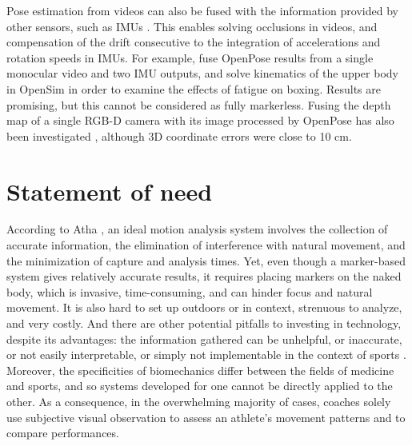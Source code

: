 Pose estimation from videos can also be fused with the information provided by other sensors, such as IMUs \cite{Bao2022, Zhang2020}. This enables solving occlusions in videos, and compensation of the drift consecutive to the integration of accelerations and rotation speeds in IMUs. For example, \cite{Haralabidis2020} fuse OpenPose results from a single monocular video and two IMU outputs, and solve kinematics of the upper body in OpenSim in order to examine the effects of fatigue on boxing. Results are promising, but this cannot be considered as fully markerless. Fusing the depth map of a single RGB-D camera with its image processed by OpenPose has also been investigated \cite{Liu2022c}, although 3D coordinate errors were close to 10 cm.

\medskip


\section{Statement of need}\label{sec:statement of need}

According to Atha \cite{Atha1984}, an ideal motion analysis system involves the collection of accurate information, the elimination of interference with natural movement, and the minimization of capture and analysis times. Yet, even though a marker-based system gives relatively accurate results, it requires placing markers on the naked body, which is invasive, time-consuming, and can hinder focus and natural movement. It is also hard to set up outdoors or in context, strenuous to analyze, and very costly. And there are other potential pitfalls to investing in technology, despite its advantages: the information gathered can be unhelpful, or inaccurate, or not easily interpretable, or simply not implementable in the context of sports \cite{Windt2020}. Moreover, the specificities of biomechanics differ between the fields of medicine and sports, and so systems developed for one cannot be directly applied to the other. As a consequence, in the overwhelming majority of cases, coaches solely use subjective visual observation to assess an athlete's movement patterns and to compare performances. 


